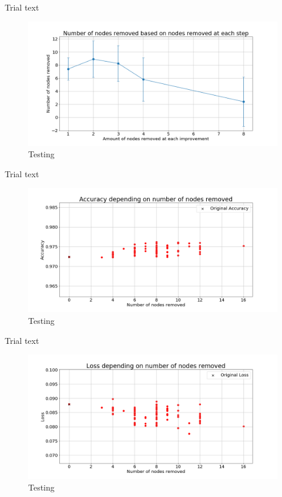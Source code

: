 \documentclass[UKenglish]{ifimaster}
\begin{document}
            Trial text

            \begin{figure}[h!]\centering
                \includegraphics[width=\textwidth]{Num_rem_vs_size_removed_mnist.png}
                \caption[Short title]{Testing}
                \label{fig:num_rem_rn_imp_mnist}
            \end{figure}

            Trial text

            \begin{figure}[h!]\centering
                \includegraphics[width=\textwidth]{Accuracy_vs_nodes_removed_mnist.png}
                \caption[Short title]{Testing}
                \label{fig:acc_rn_imp_mnist}
            \end{figure}

            Trial text

            \begin{figure}[h!]\centering
                \includegraphics[width=\textwidth]{Loss_vs_nodes_removed_mnist.png}
                \caption[Short title]{Testing}
                \label{fig:loss_rn_imp_mnist}
            \end{figure}
\end{document}
